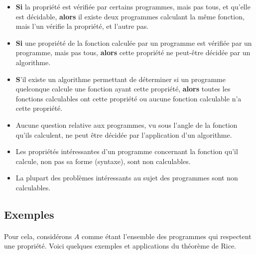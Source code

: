 \begin{itemize}
	\item \textbf{Si} la propriété est vérifiée par certains programmes, mais pas tous,
		et qu'elle est décidable, \textbf{alors} il existe deux programmes calculant la
		même fonction, mais l'un vérifie la propriété, et l'autre pas.

	\item \textbf{Si} une propriété de la fonction calculée par un programme est vérifiée par un programme, mais pas tous,
		\textbf{alors} cette propriété ne peut-être décidée par un algorithme.

	\item \textbf{S}'il existe un algorithme permettant de déterminer si un
		programme quelconque calcule une fonction ayant cette propriété,
		\textbf{alors} toutes les fonctions calculables ont cette propriété ou
		aucune fonction calculable n'a cette propriété.

	\item Aucune question relative aux programmes, vu sous l'angle de la
		fonction qu'ils calculent, ne peut être décidée par
		l'application d'un algorithme.

	\item Les propriétés intéressantes d'un programme concernant la
		fonction qu'il calcule, non pas sa forme (syntaxe), sont non calculables.

	\item La plupart des problèmes intéressants au sujet des programmes sont non calculables.
\end{itemize}

\subsection{Exemples}

\paragraph{}Pour cela, considérons $A$ comme étant l'ensemble des programmes qui
respectent une propriété. Voici quelques exemples et applications du théorème de Rice.

